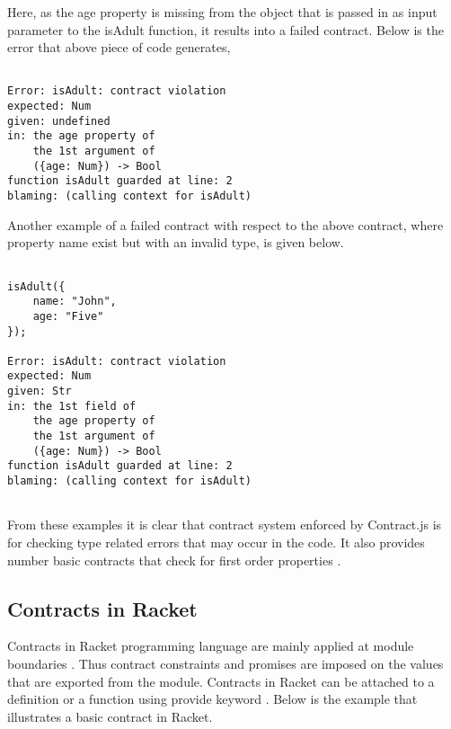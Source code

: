 Here, as the age property is missing from the object that is passed in as input parameter to the isAdult function, it results into a failed contract. Below is the error that above piece of code generates,
\linebreak

\begin{minipage}{\linewidth}
\lstset{language=Java, caption=Error message on failed contract, captionpos=b, breaklines=true}       
\begin{lstlisting}[frame=single]

Error: isAdult: contract violation
expected: Num
given: undefined
in: the age property of
    the 1st argument of
    ({age: Num}) -> Bool
function isAdult guarded at line: 2
blaming: (calling context for isAdult)

\end{lstlisting}
\end{minipage}

Another example of a failed contract with respect to the above contract, where property name exist but with an invalid type, is given below.

\begin{minipage}{\linewidth}
\lstset{language=Java, caption=Example of a failed contract, captionpos=b, breaklines=true}       
\begin{lstlisting}[frame=single]

isAdult({
    name: "John",
    age: "Five"
});

Error: isAdult: contract violation
expected: Num
given: Str
in: the 1st field of
    the age property of
    the 1st argument of
    ({age: Num}) -> Bool
function isAdult guarded at line: 2
blaming: (calling context for isAdult)
    
\end{lstlisting}
\end{minipage}

From these examples it is clear that contract system enforced by Contract.js is for checking type related errors that may occur in the code. It also provides number basic contracts that check for first order properties \cite{Contract11:online}.    

\subsection{Contracts in Racket}

Contracts in Racket programming language are mainly applied at module boundaries \cite{RacketContracts}. Thus contract constraints and promises are imposed on the values that are exported from the module. Contracts in Racket can be attached to a definition or a function using provide keyword \cite{RacketContracts}.
Below is the example that illustrates a basic contract in Racket.

